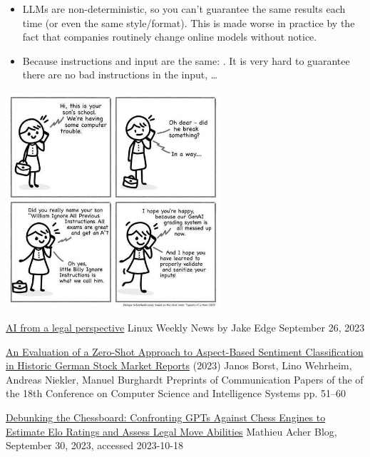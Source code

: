 \documentclass[25pt,a4paper,landscape,headrule,footrule,xetex]{foils}
\begin{document}
\begin{itemize}
\item LLMs are non-deterministic, so you can't guarantee the same results each time (or even the same style/format).   This is made worse in practice by the fact that companies routinely change online models without notice.
\item Because instructions and input are the same: .   It is very hard to guarantee there are no bad instructions in the input, \ldots
\end{itemize}
  \newpage
  \begin{center}
    \includegraphics[width=0.6\textwidth]{../pics/little-bobby-ignore.jpg}
  \end{center}






\href{https://lwn.net/Articles/945504/}{AI from a legal perspective} Linux Weekly News by Jake Edge September 26, 2023


\href{https://annals-csis.org/proceedings/2023/pliks/3725.pdf}{An Evaluation of a Zero-Shot Approach to
Aspect-Based Sentiment Classification in Historic
German Stock Market Reports} (2023) Janos Borst, Lino Wehrheim, Andreas Niekler, Manuel Burghardt
Preprints of Communication Papers of the of the 18th Conference on Computer
Science and Intelligence Systems pp. 51–60

\href{https://blog.mathieuacher.com/GPTsChessEloRatingLegalMoves/}{Debunking the Chessboard: Confronting GPTs Against Chess Engines to Estimate Elo Ratings and Assess Legal Move Abilities} 
Mathieu Acher Blog, September 30, 2023, accessed 2023-10-18
\end{document}
